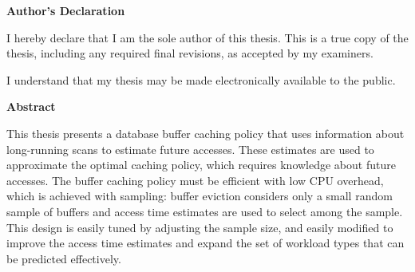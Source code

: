 \cleardoublepage %
 

 \begin{center}\textbf{Author's Declaration}\end{center}

 \noindent
I hereby declare that I am the sole author of this thesis. This is a true copy of the thesis, including any required final revisions, as accepted by my examiners.
 \noindent  
  \bigskip
  
  \noindent
I understand that my thesis may be made electronically available to the public.

\cleardoublepage
{}    %

\begin{center}\textbf{Abstract}\end{center}



This thesis presents a database buffer caching policy that uses information about long-running scans to estimate future accesses. These estimates are used to approximate the optimal caching policy, which requires knowledge about future accesses. The buffer caching policy must be efficient with low CPU overhead, which is achieved with sampling: buffer eviction considers only a small random sample of buffers and access time estimates are used to select among the sample. This design is easily tuned by adjusting the sample size, and easily modified to improve the access time estimates and expand the set of workload types that can be predicted effectively.

